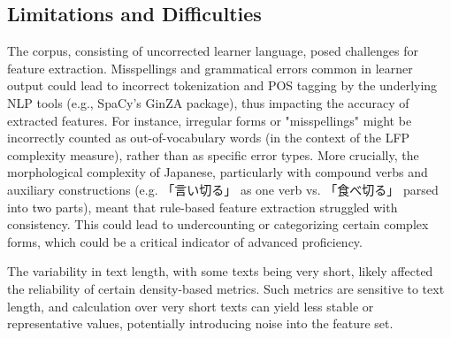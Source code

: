 \subsection{Limitations and Difficulties}


The corpus, consisting of uncorrected learner language, posed challenges for feature extraction. Misspellings and
grammatical errors common in learner output could lead to incorrect tokenization and POS tagging by the underlying
NLP tools (e.g., SpaCy's GinZA package), thus impacting the accuracy of extracted features. For instance, irregular
forms or "misspellings" might be incorrectly counted as out-of-vocabulary words (in the context of the LFP complexity
measure), rather than as specific error types. More crucially, the morphological complexity of Japanese,
particularly with compound verbs and auxiliary constructions (e.g. 「言い切る」 as one verb vs. 「食べ切る」 parsed into two
parts), meant that rule-based feature extraction struggled with consistency. This could lead to undercounting or
categorizing certain complex forms, which could be a critical indicator of advanced proficiency.

The variability in text length, with some texts being very short, likely affected the reliability of certain
density-based metrics. Such metrics are sensitive to text
length, and calculation over very short texts can yield less stable or representative values, potentially
introducing noise into the feature set.

